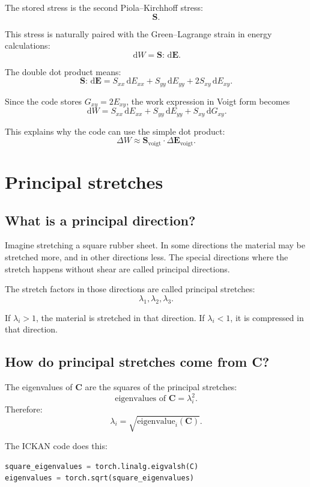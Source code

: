 \documentclass[11pt]{article}
\newcommand{\E}{\bm{E}}
\newcommand{\C}{\bm{C}}
\newcommand{\Sstress}{\bm{S}}
\newcommand{\dd}{\,\mathrm{d}}
\begin{document}
The stored stress is the second Piola--Kirchhoff stress:
\[
  \Sstress.
\]

This stress is naturally paired with the Green--Lagrange strain in energy
calculations:
\[
  \dd W = \Sstress : \dd \E.
\]

The double dot product means:
\[
  \Sstress : \dd \E
  =
  S_{xx}\dd E_{xx}
  +
  S_{yy}\dd E_{yy}
  +
  2S_{xy}\dd E_{xy}.
\]

Since the code stores $G_{xy}=2E_{xy}$, the work expression in Voigt form becomes
\[
  \dd W
  =
  S_{xx}\dd E_{xx}
  +
  S_{yy}\dd E_{yy}
  +
  S_{xy}\dd G_{xy}.
\]

This explains why the code can use the simple dot product:
\[
  \Delta W \approx \Sstress_{\mathrm{voigt}}\cdot \Delta \E_{\mathrm{voigt}}.
\]

\section{Principal stretches}

\subsection{What is a principal direction?}

Imagine stretching a square rubber sheet. In some directions the material may be
stretched more, and in other directions less. The special directions where the
stretch happens without shear are called principal directions.

The stretch factors in those directions are called principal stretches:
\[
  \lambda_1,\lambda_2,\lambda_3.
\]

If $\lambda_i > 1$, the material is stretched in that direction. If
$\lambda_i < 1$, it is compressed in that direction.

\subsection{How do principal stretches come from C?}

The eigenvalues of $\C$ are the squares of the principal stretches:
\[
  \text{eigenvalues of } \C
  =
  \lambda_i^2.
\]
Therefore:
\[
  \lambda_i = \sqrt{\text{eigenvalue}_i(\C)}.
\]

The ICKAN code does this:

\begin{lstlisting}[language=Python]
square_eigenvalues = torch.linalg.eigvalsh(C)
eigenvalues = torch.sqrt(square_eigenvalues)
\end{lstlisting}
\end{document}
